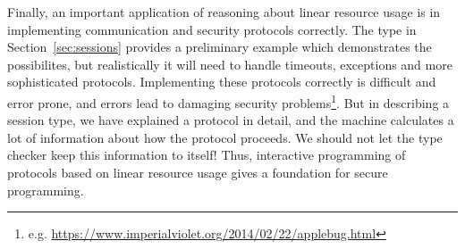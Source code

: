 Finally, an important application of reasoning about linear resource usage
is in implementing communication and security protocols correctly. The
 type in Section~\ref{sec:sessions} provides a preliminary example
which demonstrates the possibilites, but realistically it will need to
handle timeouts, exceptions and more sophisticated protocols. Implementing
these protocols correctly is difficult and error prone, and errors lead
to damaging security problems\footnote{e.g. \url{https://www.imperialviolet.org/2014/02/22/applebug.html}}.
But in describing a session type, we have explained a protocol in detail,
and the machine calculates a lot of information about how the protocol
proceeds. We should not let the type checker keep this information to itself!
Thus, interactive programming of protocols based on linear resource usage
gives a foundation for secure programming.

